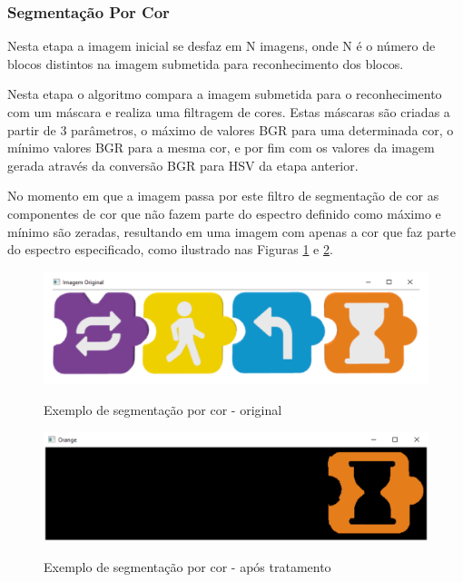     
    \subsubsection{Segmentação Por Cor}
    Nesta etapa a imagem inicial se desfaz em N imagens, onde N  é o número de blocos distintos na imagem submetida para reconhecimento dos blocos.
    
    Nesta etapa o algoritmo compara a imagem submetida para o reconhecimento com um máscara e realiza uma filtragem de cores. Estas máscaras são criadas a partir de 3 parâmetros, o máximo de valores BGR para uma determinada cor, o mínimo valores BGR para a mesma cor, e por fim com os valores da imagem gerada através da conversão BGR para HSV da etapa anterior. 
    
    No momento em que a imagem passa por este filtro de segmentação de cor as componentes de cor que não fazem parte do espectro definido como máximo e mínimo são zeradas, resultando em uma imagem com apenas a cor que faz parte do espectro especificado, como ilustrado nas Figuras \ref{figura:ex1_original} e \ref{figura:ex1_tratado}.
    
    \begin{figure}[H]
        \caption{Exemplo de segmentação por cor - original}
        \centering
        \includegraphics[width=\linewidth]{Imagens/Cap4/ex1_original.PNG}
        \label{figura:ex1_original}
    \end{figure}
    
    
    \begin{figure}[H]
        \caption{Exemplo de segmentação por cor - após tratamento}
        \centering
        \includegraphics[width=\linewidth]{Imagens/Cap4/ex1_tratado.PNG}
        \label{figura:ex1_tratado}
    \end{figure}
    
